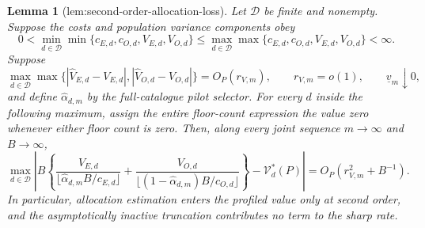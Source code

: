\documentclass{article}
\newtheorem{lemma}{Lemma}
\begin{document}
\begin{lemma}[lem:second-order-allocation-loss]\label{lem:second-order-allocation-loss}
Let \(\mathcal D\) be finite and nonempty. Suppose the costs and population variance components obey
\[
0<\min_{d\in\mathcal D}\min\{c_{E,d},c_{O,d},V_{E,d},V_{O,d}\}
\le
\max_{d\in\mathcal D}\max\{c_{E,d},c_{O,d},V_{E,d},V_{O,d}\}<\infty.
\]
Suppose
\[
\max_{d\in\mathcal D}\max\bigl\{
|\widehat V_{E,d}-V_{E,d}|,
|\widehat V_{O,d}-V_{O,d}|\bigr\}=O_P(r_{V,m}),
\qquad r_{V,m}=o(1),
\qquad \underline v_m\downarrow0,
\]
and define \(\widehat\alpha_{d,m}\) by the full-catalogue pilot selector. For every \(d\) inside the following maximum, assign the entire floor-count expression the value zero whenever either floor count is zero. Then, along every joint sequence \(m\to\infty\) and \(B\to\infty\),
\[
\max_{d\in\mathcal D}\left|B\left\{
\frac{V_{E,d}}{\lfloor\widehat\alpha_{d,m}B/c_{E,d}\rfloor}
+\frac{V_{O,d}}{\lfloor(1-\widehat\alpha_{d,m})B/c_{O,d}\rfloor}
\right\}-\mathcal V_d^*(P)\right|
=O_P\!\left(r_{V,m}^2+B^{-1}\right).
\]
In particular, allocation estimation enters the profiled value only at second order, and the asymptotically inactive truncation contributes no term to the sharp rate.
\end{lemma}
\end{document}
